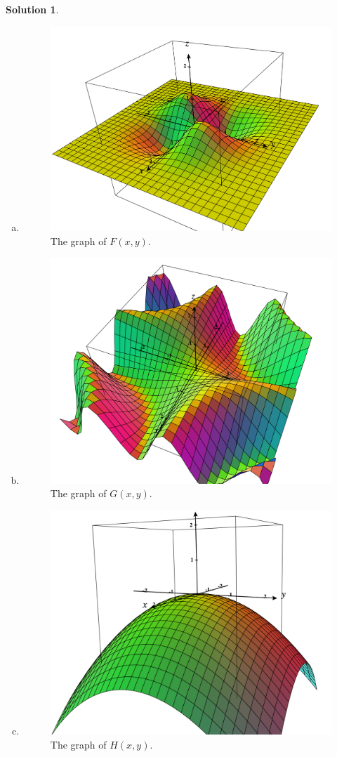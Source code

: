 \documentclass[12pt]{report} %
\theoremstyle{definition}
\newtheorem{solution}{Solution}
\begin{document}
\begin{solution}~
\begin{enumerate}[(a)]
    \item 
    \begin{figure}[H]
        \centering
        \includegraphics[width=.6\textwidth]{Images/4a.png}
        \caption{The graph of $F(x,y)$.}
    \end{figure}
    \item
    \begin{figure}[H]
        \centering
        \includegraphics[width=.6\textwidth]{Images/4b.png}
        \caption{The graph of $G(x,y)$.}
    \end{figure}
    \item
    \begin{figure}[H]
        \centering
        \includegraphics[width=.6\textwidth]{Images/4c.png}
        \caption{The graph of $H(x,y)$.}
    \end{figure}
\end{enumerate}
\end{solution}
\end{document}
